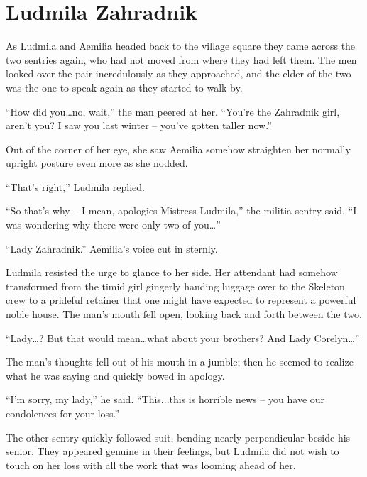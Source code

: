 \chapter{Ludmila Zahradnik}

As Ludmila and Aemilia headed back to the village square they came across the two sentries again, who had not moved from where they had left them. The men looked over the pair incredulously as they approached, and the elder of the two was the one to speak again as they started to walk by.

 

“How did you…no, wait,” the man peered at her. “You’re the Zahradnik girl, aren’t you? I saw you last winter – you’ve gotten taller now.”

 

Out of the corner of her eye, she saw Aemilia somehow straighten her normally upright posture even more as she nodded.

 

“That’s right,” Ludmila replied.

 

“So that’s why – I mean, apologies Mistress Ludmila,” the militia sentry said. “I was wondering why there were only two of you…”

 

“Lady Zahradnik.” Aemilia’s voice cut in sternly.

 

Ludmila resisted the urge to glance to her side. Her attendant had somehow transformed from the timid girl gingerly handing luggage over to the Skeleton crew to a prideful retainer that one might have expected to represent a powerful noble house. The man’s mouth fell open, looking back and forth between the two.

 

“Lady…? But that would mean…what about your brothers? And Lady Corelyn…”

 

The man’s thoughts fell out of his mouth in a jumble; then he seemed to realize what he was saying and quickly bowed in apology.

 

“I’m sorry, my lady,” he said. “This...this is horrible news – you have our condolences for your loss.”

 

The other sentry quickly followed suit, bending nearly perpendicular beside his senior. They appeared genuine in their feelings, but Ludmila did not wish to touch on her loss with all the work that was looming ahead of her.

